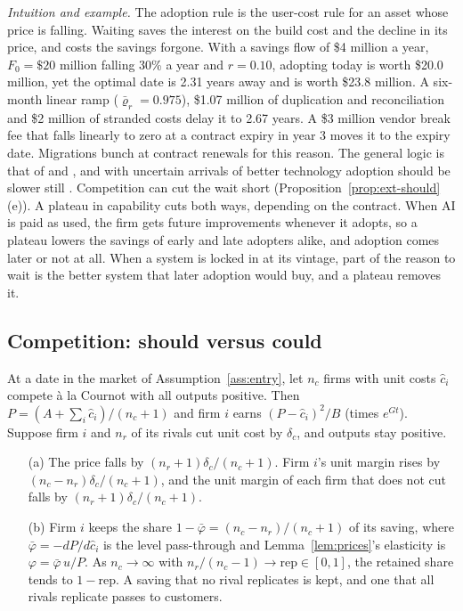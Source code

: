 \noindent\emph{Intuition and example.} The adoption rule is the user-cost rule for an asset whose price is falling. Waiting saves the interest on the build cost and the decline in its price, and costs the savings forgone. With a savings flow of \$4 million a year, $F_0=\$20$ million falling 30\% a year and $r=0.10$, adopting today is worth \$20.0 million, yet the optimal date is 2.31 years away and is worth \$23.8 million. A six-month linear ramp ($\bar\varrho_r=0.975$), \$1.07 million of duplication and reconciliation and \$2 million of stranded costs delay it to 2.67 years. A \$3 million vendor break fee that falls linearly to zero at a contract expiry in year 3 moves it to the expiry date. Migrations bunch at contract renewals for this reason. The general logic is that of \citet{mcdonald1986value} and \citet{dixit1994investment}, and with uncertain arrivals of better technology adoption should be slower still \citep{farzin1998optimal}. Competition can cut the wait short (Proposition~\ref{prop:ext-should}(e)). A plateau in capability cuts both ways, depending on the contract. When AI is paid as used, the firm gets future improvements whenever it adopts, so a plateau lowers the savings of early and late adopters alike, and adoption comes later or not at all. When a system is locked in at its vintage, part of the reason to wait is the better system that later adoption would buy, and a plateau removes it.

\subsection{Competition: should versus could}\label{sec:ext-competition}

\begin{lemma}\label{lem:ext-retained}
At a date in the market of Assumption~\ref{ass:entry}, let $n_c$ firms with unit costs $\hat c_i$ compete \`a la Cournot with all outputs positive. Then $P=(A+\sum_i\hat c_i)/(n_c+1)$ and firm $i$ earns $(P-\hat c_i)^2/B$ (times $e^{Gt}$). Suppose firm $i$ and $n_r$ of its rivals cut unit cost by $\delta_c$, and outputs stay positive.
\begin{enumerate}
\item[(a)] The price falls by $(n_r+1)\delta_c/(n_c+1)$. Firm $i$'s unit margin rises by $(n_c-n_r)\delta_c/(n_c+1)$, and the unit margin of each firm that does not cut falls by $(n_r+1)\delta_c/(n_c+1)$.
\item[(b)] Firm $i$ keeps the share $1-\bar\varphi=(n_c-n_r)/(n_c+1)$ of its saving, where $\bar\varphi=-dP/d\hat c_i$ is the level pass-through and Lemma~\ref{lem:prices}'s elasticity is $\varphi=\bar\varphi\,u/P$. As $n_c\to\infty$ with $n_r/(n_c-1)\to\mathrm{rep}\in[0,1]$, the retained share tends to $1-\mathrm{rep}$. A saving that no rival replicates is kept, and one that all rivals replicate passes to customers.
\end{enumerate}
\end{lemma}

